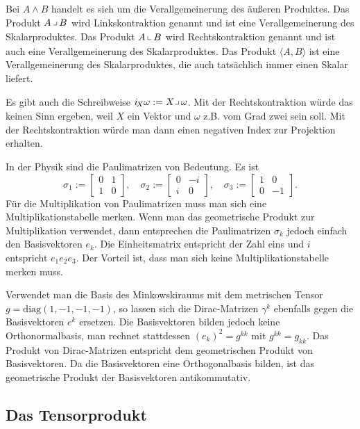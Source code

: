 \documentclass[a4paper,10pt,fleqn,twocolumn,twoside]{article}
\begin{document}
Bei \(A\wedge B\) handelt es sich um die Verallgemeinerung des
äußeren Produktes.
Das Produkt \(A\,\big\lrcorner\,B\) wird Linkskontraktion genannt
und ist eine Verallgemeinerung des Skalarproduktes.
Das Produkt \(A\,\big\llcorner\,B\) wird Rechtskontraktion genannt
und ist auch eine Verallgemeinerung des Skalarproduktes.
Das Produkt \(\langle A,B\rangle\) ist eine Verallgemeinerung des
Skalarproduktes, die auch tatsächlich immer einen Skalar liefert.

Es gibt auch die Schreibweise
\(i_{\!X} \omega := X\big\lrcorner\,\omega\). Mit der
Rechtskontraktion würde das keinen Sinn ergeben, weil \(X\) ein
Vektor und \(\omega\) z.B. vom Grad zwei sein soll. Mit der
Rechtskontraktion würde man dann einen negativen Index zur
Projektion erhalten.

In der Physik sind die Paulimatrizen von Bedeutung. Es ist
\[
\sigma_1 := \begin{bmatrix}0 & 1\\ 1 & 0\end{bmatrix},\quad
\sigma_2 := \begin{bmatrix}0 & -i\\ i & 0\end{bmatrix},\quad
\sigma_3 := \begin{bmatrix}1 & 0\\ 0 & -1\end{bmatrix}.
\]
Für die Multiplikation von Paulimatrizen muss man sich
eine Multiplikationstabelle merken. Wenn man das geometrische
Produkt zur Multiplikation verwendet, dann entsprechen
die Paulimatrizen \(\sigma_k\) jedoch einfach den
Basisvektoren \(e_k\). Die Einheitsmatrix entspricht der Zahl eins
und \(i\) entspricht \(e_1e_2e_3\). Der Vorteil ist,
dass man sich keine Multiplikationstabelle merken muss.

Verwendet man die Basis des Minkowskiraums mit dem metrischen Tensor
\(g=\mathrm{diag}(1,-1,-1,-1)\), so lassen sich die Dirac-Matrizen
\(\gamma^k\) ebenfalls gegen die Basisvektoren \(e^k\) ersetzen.
Die Basisvektoren bilden jedoch keine Orthonormalbasis, man rechnet
stattdessen \((e_k)^2=g^{kk}\) mit \(g^{kk}=g_{kk}\). Das Produkt
von Dirac-Matrizen entspricht dem geometrischen Produkt von
Basisvektoren. Da die Basisvektoren eine Orthogonalbasis bilden,
ist das geometrische Produkt der Basisvektoren antikommutativ.


\subsection{Das Tensorprodukt}
\end{document}
